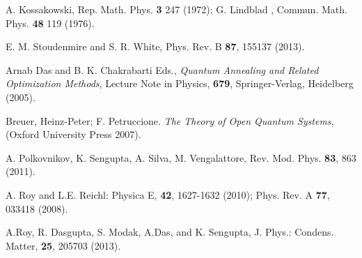 \documentclass[a4paper,11pt,color]{article}
\renewenvironment{thebibliography}[1]{%
    \begin{oldthebibliography}{#1}%
      \setlength{\parskip}{0ex}%
      \setlength{\itemsep}{0ex}%
  }%
  {%
    \end{oldthebibliography}%
  }
\begin{document}
\begin{thebibliography}{}
A. Kossakowski, Rep. Math. Phys. {\bf 3} 247 (1972); G. Lindblad , Commun. Math. Phys. {\bf 48} 119 (1976).

E. M. Stoudenmire and S. R. White, Phys. Rev. B {\bf 87}, 155137 (2013).

Arnab Das and B. K. Chakrabarti Eds., \textit{Quantum Annealing and Related Optimization Methods}, Lecture Note in Physics, {\bf 679}, Springer-Verlag, Heidelberg (2005).

Breuer, Heinz-Peter; F. Petruccione. \textit{The Theory of Open Quantum Systems}, (Oxford University Press 2007).

A. Polkovnikov, K. Sengupta, A. Silva, M. Vengalattore, Rev. Mod. Phys. \textbf{83}, 863 (2011).

A. Roy and L.E. Reichl:  Physica {E}, {\bf 42}, 1627-1632 (2010); Phys. Rev. {A} {\bf 77}, 033418 (2008).

A.Roy, R. Dasgupta, S. Modak, A.Das, and K. Sengupta, J. Phys.: Condens. Matter, {\bf 25}, 205703 (2013).

\end{thebibliography}
\end{document}
